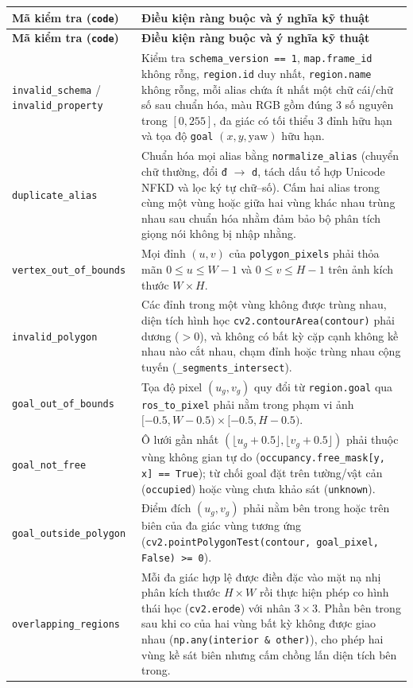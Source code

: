 \begin{longtable}{|p{}|p{}|}
\hline
\textbf{Mã kiểm tra (\texttt{code})} & \textbf{Điều kiện ràng buộc và ý nghĩa kỹ thuật} \\
\hline
\endfirsthead
\hline
\textbf{Mã kiểm tra (\texttt{code})} & \textbf{Điều kiện ràng buộc và ý nghĩa kỹ thuật} \\
\hline
\endhead
\texttt{invalid\_schema} / \texttt{invalid\_property} & Kiểm tra \texttt{schema\_version == 1}, \texttt{map.frame\_id} không rỗng, \texttt{region.id} duy nhất, \texttt{region.name} không rỗng, mỗi alias chứa ít nhất một chữ cái/chữ số sau chuẩn hóa, màu RGB gồm đúng 3 số nguyên trong $[0, 255]$, đa giác có tối thiểu 3 đỉnh hữu hạn và tọa độ \texttt{goal} $(x, y, \text{yaw})$ hữu hạn. \\
\hline
\texttt{duplicate\_alias} & Chuẩn hóa mọi alias bằng \texttt{normalize\_alias} (chuyển chữ thường, đổi \texttt{đ} $\rightarrow$ \texttt{d}, tách dấu tổ hợp Unicode NFKD và lọc ký tự chữ--số). Cấm hai alias trong cùng một vùng hoặc giữa hai vùng khác nhau trùng nhau sau chuẩn hóa nhằm đảm bảo bộ phân tích giọng nói không bị nhập nhằng. \\
\hline
\texttt{vertex\_out\_of\_bounds} & Mọi đỉnh $(u, v)$ của \texttt{polygon\_pixels} phải thỏa mãn $0 \le u \le W - 1$ và $0 \le v \le H - 1$ trên ảnh kích thước $W \times H$. \\
\hline
\texttt{invalid\_polygon} & Các đỉnh trong một vùng không được trùng nhau, diện tích hình học \texttt{cv2.contourArea(contour)} phải dương ($> 0$), và không có bất kỳ cặp cạnh không kề nhau nào cắt nhau, chạm đỉnh hoặc trùng nhau cộng tuyến (\texttt{\_segments\_intersect}). \\
\hline
\texttt{goal\_out\_of\_bounds} & Tọa độ pixel $(u_g, v_g)$ quy đổi từ \texttt{region.goal} qua \texttt{ros\_to\_pixel} phải nằm trong phạm vi ảnh $[-0.5, W - 0.5) \times [-0.5, H - 0.5)$. \\
\hline
\texttt{goal\_not\_free} & Ô lưới gần nhất $(\lfloor u_g + 0.5 \rfloor, \lfloor v_g + 0.5 \rfloor)$ phải thuộc vùng không gian tự do (\texttt{occupancy.free\_mask[y, x] == True}); từ chối goal đặt trên tường/vật cản (\texttt{occupied}) hoặc vùng chưa khảo sát (\texttt{unknown}). \\
\hline
\texttt{goal\_outside\_polygon} & Điểm đích $(u_g, v_g)$ phải nằm bên trong hoặc trên biên của đa giác vùng tương ứng (\texttt{cv2.pointPolygonTest(contour, goal\_pixel, False) >= 0}). \\
\hline
\texttt{overlapping\_regions} & Mỗi đa giác hợp lệ được điền đặc vào mặt nạ nhị phân kích thước $H \times W$ rồi thực hiện phép co hình thái học (\texttt{cv2.erode}) với nhân $3 \times 3$. Phần bên trong sau khi co của hai vùng bất kỳ không được giao nhau (\texttt{np.any(interior \& other)}), cho phép hai vùng kề sát biên nhưng cấm chồng lấn diện tích bên trong. \\
\hline
\end{longtable}

